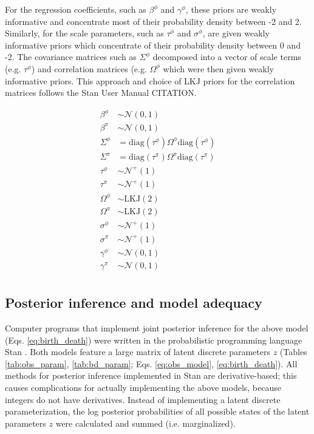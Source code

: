 \documentclass[12pt,letterpaper]{article}
\begin{document}
For the regression coefficients, such as \(\beta^{\phi}\) and \(\gamma^{\phi}\), these priors are weakly informative and concentrate most of their probability density between -2 and 2. Similarly, for the scale parameters, such as \(\tau^{\phi}\) and \(\sigma^{\phi}\), are given weakly informative priors which concentrate of their probability density between 0 and -2. The covariance matrices such as \(\Sigma^{\phi}\) decomposed into a vector of scale terms (e.g. \(\tau^{\phi}\)) and correlation matrices (e.g. \(\Omega^{\phi}\) which were then given weakly informative priors. This approach and choice of LKJ priors for the correlation matrices follows the Stan User Manual CITATION.


\begin{equation}
  \begin{aligned}
    \beta^{\phi} &\sim \mathcal{N}(0, 1) \\
    \beta^{\pi} &\sim \mathcal{N}(0, 1) \\
    \Sigma^{\phi} &= \text{diag}(\tau^{\phi}) \Omega^{\phi} \text{diag}(\tau^{\phi}) \\
    \Sigma^{\pi} &= \text{diag}(\tau^{\pi}) \Omega^{\pi} \text{diag}(\tau^{\pi}) \\
    \tau^{\phi} &\sim \mathcal{N}^{+}(1) \\
    \tau^{\pi} &\sim \mathcal{N}^{+}(1) \\
    \Omega^{\phi} &\sim \text{LKJ}(2) \\
    \Omega^{\pi} &\sim \text{LKJ}(2) \\
    \sigma^{\phi} &\sim \mathcal{N}^{+}(1) \\
    \sigma^{\pi} &\sim \mathcal{N}^{+}(1) \\
    \gamma^{\phi} &\sim \mathcal{N}(0, 1) \\
    \gamma^{\pi} &\sim \mathcal{N}(0, 1) \\
  \end{aligned}
  \label{eq:prior}
\end{equation}




\subsection*{Posterior inference and model adequacy}
Computer programs that implement joint posterior inference for the above model (Eqs. \ref{eq:birth_death}) were written in the probabilistic programming language Stan \citep{StanDevelopmentTeam2016}. Both models feature a large matrix of latent discrete parameters \(z\) (Tables \ref{tab:obs_param}, \ref{tab:bd_param}; Eqs. \ref{eq:obs_model}, \ref{eq:birth_death}). All methods for posterior inference implemented in Stan are derivative-based; this causes complications for actually implementing the above models, because integers do not have derivatives. Instead of implementing a latent discrete parameterization, the log posterior probabilities of all possible states of the latent parameters \(z\) were calculated and summed (i.e. marginalized). 
\end{document}

